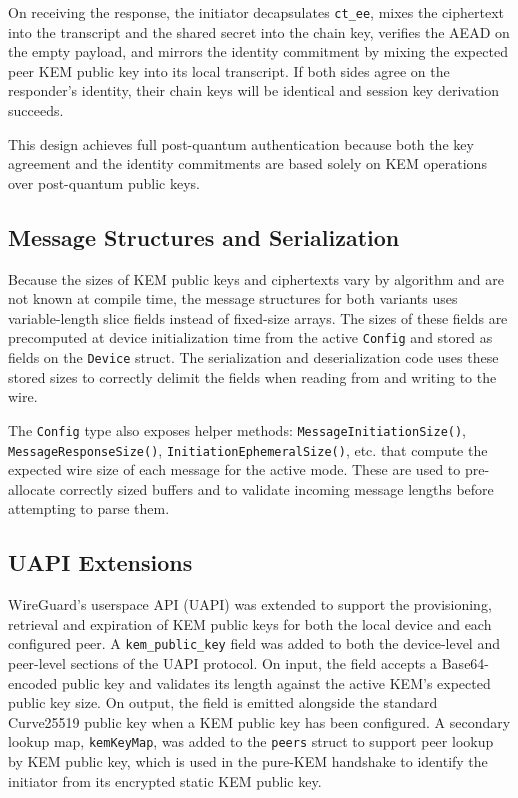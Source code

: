 On receiving the response, the initiator decapsulates \texttt{ct\_ee}, mixes the ciphertext into the transcript and the shared secret into the chain key, verifies the AEAD on the empty payload, and mirrors the identity commitment by mixing the expected peer KEM public key into its local transcript. If both sides agree on the responder's identity, their chain keys will be identical and session key derivation succeeds. 

This design achieves full post-quantum authentication because both the key agreement and the identity commitments are based solely on KEM operations over post-quantum public keys.

\subsection{Message Structures and Serialization}
Because the sizes of KEM public keys and ciphertexts vary by algorithm and are not known at compile time, the message structures for both variants uses variable-length slice fields instead of fixed-size arrays. The sizes of these fields are precomputed at device initialization time from the active \texttt{Config} and stored as fields on the \texttt{Device} struct. The serialization and deserialization code uses these stored sizes to correctly delimit the fields when reading from and writing to the wire. 

The \texttt{Config} type also exposes helper methods: \texttt{MessageInitiationSize()}, \\\texttt{MessageResponseSize()}, \texttt{InitiationEphemeralSize()}, etc. that compute the expected wire size of each message for the active mode. These are used to pre-allocate correctly sized buffers and to validate incoming message lengths before attempting to parse them.

\subsection{UAPI Extensions}
WireGuard's userspace API (UAPI) was extended to support the provisioning, retrieval and expiration of KEM public keys for both the local device and each configured peer. A \texttt{kem\_public\_key} field was added to both the device-level and peer-level sections of the UAPI protocol. On input, the field accepts a Base64-encoded public key and validates its length against the active KEM's expected public key size. On output, the field is emitted alongside the standard Curve25519 public key when a KEM public key has been configured. A secondary lookup map, \texttt{kemKeyMap}, was added to the \texttt{peers} struct to support peer lookup by KEM public key, which is used in the pure-KEM handshake to identify the initiator from its encrypted static KEM public key.



